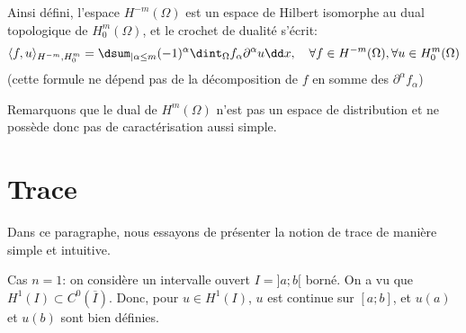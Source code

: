 \medskip
Ainsi défini, l'espace $H^{-m}(\Omega)$ est un espace de Hilbert isomorphe au dual
topologique de $H^m_0(\Omega)$, et le crochet de dualité s'écrit:
\begin{equation}
\langle f,u\rangle_{H^{-m},H_0^m} = \dsum_{|\alpha\le m} (-1)^\alpha \dint_\Omega
f_\alpha \partial^\alpha u \dd x,
\quad \forall f\in H^{-m}(\Omega), \forall u\in H^m_0(\Omega)
\end{equation}
(cette formule ne dépend pas de la décomposition de $f$ en somme des $\partial^\alpha f_\alpha$)

\medskip
Remarquons que le dual de $H^m(\Omega)$ n'est pas un espace de distribution et ne possède
donc pas de caractérisation aussi simple.

\medskip
\section{Trace}

Dans ce paragraphe, nous essayons de présenter la notion de trace de manière simple et intuitive.

\medskip
{}

\medskip
Cas $n=1$:
on considère un intervalle ouvert $I =]a;b[$ borné. On a vu que $H^1(I)\subset C^0(\overline{I})$.
Donc, pour $u\in H^1(I)$, $u$ est continue sur $[a;b]$, et $u(a)$ et $u(b)$ sont bien définies.

